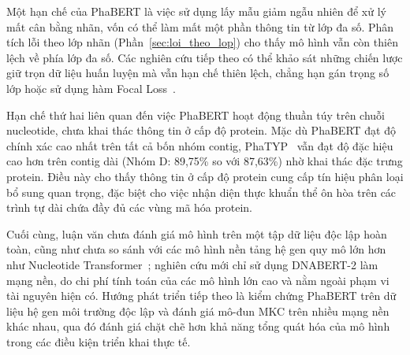 Một hạn chế của PhaBERT là việc sử dụng lấy mẫu giảm ngẫu nhiên để xử lý mất cân bằng nhãn, vốn có thể làm mất một phần thông tin từ lớp đa số. Phân tích lỗi theo lớp nhãn (Phần~\ref{sec:loi_theo_lop}) cho thấy mô hình vẫn còn thiên lệch về phía lớp đa số. Các nghiên cứu tiếp theo có thể khảo sát những chiến lược giữ trọn dữ liệu huấn luyện mà vẫn hạn chế thiên lệch, chẳng hạn gán trọng số lớp hoặc sử dụng hàm Focal Loss~\cite{lin2017focal}.

Hạn chế thứ hai liên quan đến việc PhaBERT hoạt động thuần túy trên chuỗi nucleotide, chưa khai thác thông tin ở cấp độ protein. Mặc dù PhaBERT đạt độ chính xác cao nhất trên tất cả bốn nhóm contig, PhaTYP~\cite{shang2023phatyp} vẫn đạt độ đặc hiệu cao hơn trên contig dài (Nhóm D: 89,75\% so với 87,63\%) nhờ khai thác đặc trưng protein. Điều này cho thấy thông tin ở cấp độ protein cung cấp tín hiệu phân loại bổ sung quan trọng, đặc biệt cho việc nhận diện thực khuẩn thể ôn hòa trên các trình tự dài chứa đầy đủ các vùng mã hóa protein.

Cuối cùng, luận văn chưa đánh giá mô hình trên một tập dữ liệu độc lập hoàn toàn, cũng như chưa so sánh với các mô hình nền tảng hệ gen quy mô lớn hơn như Nucleotide Transformer~\cite{dalla2025nucleotide}; nghiên cứu mới chỉ sử dụng DNABERT-2 làm mạng nền, do chi phí tính toán của các mô hình lớn cao và nằm ngoài phạm vi tài nguyên hiện có. Hướng phát triển tiếp theo là kiểm chứng PhaBERT trên dữ liệu hệ gen môi trường độc lập và đánh giá mô-đun MKC trên nhiều mạng nền khác nhau, qua đó đánh giá chặt chẽ hơn khả năng tổng quát hóa của mô hình trong các điều kiện triển khai thực tế.